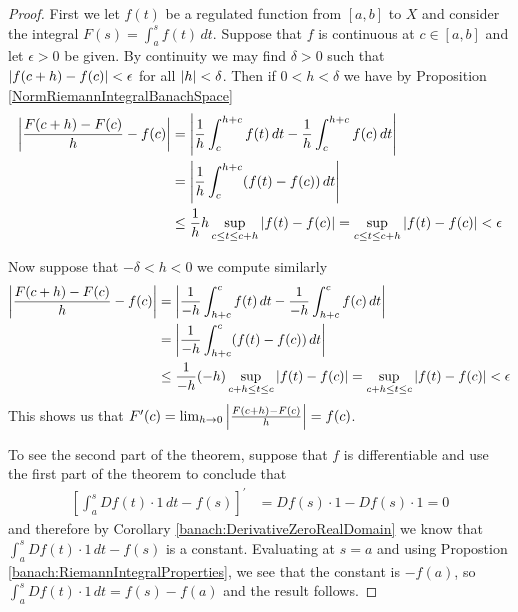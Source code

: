 \begin{proof}
First we let $f(t)$ be a regulated function from $[a,b]$ to $X$ and
consider the integral $F(s) = \int_a^s f(t) \, dt$.  Suppose that $f$ is
continuous at $c \in [a,b]$ and let $\epsilon > 0$ be given.  By
continuity we may find $\delta > 0$ such that $\left \vert f(c+h) -
  f(c) \right \vert < \epsilon$ for all $\left \vert h \right \vert < \delta$.  Then if $0 < h < \delta$ we have by Proposition \ref{NormRiemannIntegralBanachSpace}
\begin{align*}
\left \vert  \frac{F(c + h) - F(c)}{h} - f(c) \right \vert &= \left \vert \frac{1}{h}
                                          \int_c^{h+c} f(t)\, dt  -
                                          \frac{1}{h} \int_c^{h+c}
                                          f(c) \, dt \right \vert \\
&= \left \vert \frac{1}{h}  \int_c^{h+c} (f(t) - f(c)) \, dt \right \vert \\
&\leq \frac{1}{h} h \sup_{c \leq t \leq c+h} \left \vert f(t) -
  f(c) \right \vert 
=\sup_{c \leq t \leq c+h} \left \vert f(t) -  f(c) \right \vert < \epsilon
\end{align*}

Now suppose that $-\delta < h < 0$ we compute similarly
\begin{align*}
\left \vert  \frac{F(c + h) - F(c)}{h} - f(c) \right \vert &= \left \vert \frac{1}{-h}
                                          \int_{h+c}^c f(t)\, dt  -
                                          \frac{1}{-h} \int_{h+c}^c
                                          f(c) \, dt \right \vert \\
&= \left \vert \frac{1}{-h}  \int_{h+c}^c (f(t) - f(c)) \, dt \right \vert \\
&\leq \frac{1}{-h} (-h) \sup_{c+h \leq t \leq c} \left \vert f(t) -
  f(c) \right \vert 
=\sup_{c+h \leq t \leq c} \left \vert f(t) -  f(c) \right \vert < \epsilon
\end{align*} 
This shows us that $F^\prime(c) = \lim_{h \to 0} \left \vert  \frac{F(c + h) - F(c)}{h} \right \vert = f(c)$.

To see the second part of the theorem,  suppose that $f$ is differentiable and
use the first part of the theorem to conclude that
\begin{align*}
  \left [ \int_a^s Df(t) \cdot 1 \, dt - f(s) \right ]^\prime &= Df(s) \cdot 1 - Df(s) \cdot 1 = 0
\end{align*}
and therefore by Corollary \ref{banach:DerivativeZeroRealDomain} we know that $ \int_a^s Df(t) \cdot 1 \, dt - f(s)$ is a constant.
Evaluating at $s = a$ and using Propostion \ref{banach:RiemannIntegralProperties}, we see that the constant is $-f(a)$, so $\int_a^s Df(t) \cdot 1 \, dt = f(s) - f(a)$ and the result follows.
\end{proof}

